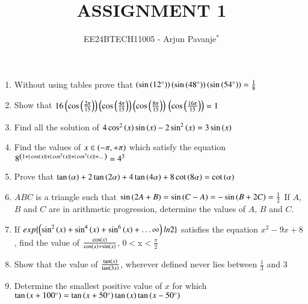 \documentclass[journal,12pt,article,twocolumn]{IEEEtran}
\theoremstyle{remark}
\begin{document}

\vspace{3cm}

\title{ASSIGNMENT 1}
\author{EE24BTECH11005 - Arjun Pavanje$^{*}$%
}
\maketitle
\newpage
\bigskip
\begin{enumerate}
\item Without using tables prove that $\brak{\sin\brak{12^{\circ}}}\brak{\sin\brak{48^{\circ}}}\brak{\sin\brak{54^{\circ}}}= \frac{1}{8}$\\
\hfill {}
\item Show that $16\brak{\cos\brak{\frac{2\pi}{15}}}\brak{\cos\brak{\frac{4\pi}{15}}}\brak{\cos\brak{\frac{8\pi}{15}}}\\\brak{\cos\brak{\frac{16\pi}{15}}}=1$ \hfill{}
\item Find all the solution of $4\cos^2\brak{x} \sin \brak{x} -2\sin^2\brak{x} = 3\sin \brak{x}$
\hfill{}
\item Find the values of $x \in \brak{-\pi, +\pi}$ which satisfy the equation
$8^{\brak{1+|\cos \brak{x}|+|\cos^2\brak{x}|+|\cos^3\brak{x}|+\dots}}= 4^3$\\
\hfill{}
\item Prove that $\tan \brak{\alpha}+2\tan \brak{2\alpha}+4\tan \brak{4\alpha}+8\cot \brak{8\alpha}=\cot \brak{\alpha}$
\hfill{}
\item $ABC$ is a triangle such that $\sin{\brak{2A+B}}=\sin{\brak{C-A}}=-\sin{\brak{B+2C}}=\frac{1}{2}$ If $A$, $B$ and $C$ are in arithmetic progression, determine the values of $A$, $B$ and $C$.
\hfill{}
\item If $exp \{\brak{\sin^2\brak{x}+\sin^4\brak{x}+\sin^6\brak{x}+\dots\infty}ln2\}$ satisfies the equation $x^2-9x+8$, find the value of $\frac{\cos \brak{x}}{\cos \brak{x} + \sin \brak{x}}$, 0$<$x$<$$\frac{\pi}{2}$
\hfill{}
\item Show that the value of  $\frac{\tan \brak{x}}{\tan \brak{3x}}$, wherever defined never lies between $\frac{1}{3}$ and 3
\hfill{}
\item Determine the smallest positive value of $x$  for which $\tan {\brak{x+100^{\circ}}}=\tan {\brak{x+50^{\circ}}}\tan \brak{x}\tan {\brak{x-50^{\circ}}}$\\
\hfill{}
$$
\end{enumerate}
\end{document}
